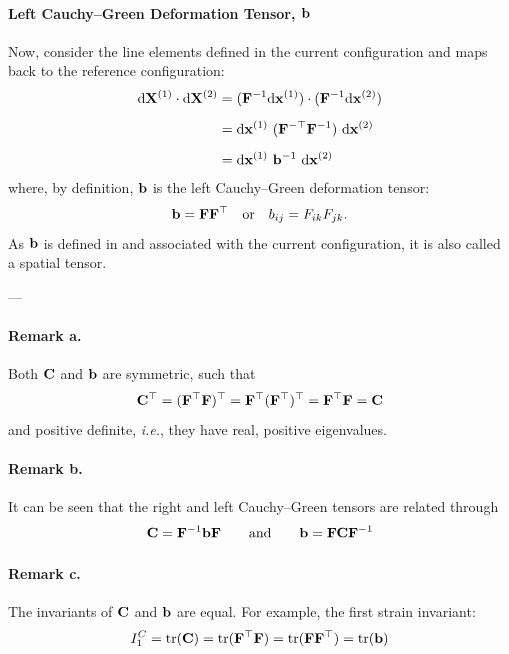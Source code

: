 \documentclass[12pt, a4paper]{article}
\numberwithin{equation}{section}
\begin{document}
\paragraph{Left Cauchy--Green Deformation Tensor, $\bf b$} Now, consider the line elements defined in the current configuration and maps back to the reference configuration:
\begin{align}
    \mathrm{d} {\bf X}^{(1)} \cdot \mathrm{d} {\bf X}^{(2)}
    & = (\bF^{-1} \mathrm{d} {\bf x}^{(1)}) \cdot (\bF^{-1} \mathrm{d} {\bf x}^{(2)}) \nonumber \\[.5em]
    & = \mathrm{d} {\bf x}^{(1)} \ (\bF^{-\top} \bF^{-1}) \ \mathrm{d} {\bf x}^{(2)} \nonumber \\[.5em]
    & = \mathrm{d} {\bf x}^{(1)} \ \bb^{-1} \ \mathrm{d} {\bf x}^{(2)}
\end{align}
where, by definition, $\bf b$ is the left Cauchy--Green deformation tensor:
\begin{equation}
    \mathbf{b} = \mathbf{F}  \mathbf{F}^\top \quad \text{or} \quad
    b_{ij} = F_{ik} F_{jk}.
\end{equation}
As $\bf b$ is defined in and associated with the current configuration, it is also called a spatial tensor.

---

\paragraph{Remark a.} Both $\bf C$ and $\bf b$ are symmetric, such that
\[
    \mathbf{C}^\top 
    = (\mathbf{F}^\top \mathbf{F})^\top 
    = \mathbf{F}^\top (\mathbf{F}^\top)^\top 
    = \mathbf{F}^\top \mathbf{F}  
    = \mathbf{C}
\]
and positive definite, \textit{i.e.}, they have real, positive eigenvalues.

\paragraph{Remark b.} It can be seen that the right and left Cauchy--Green tensors are related through
\[
    \mathbf{C} = \mathbf{F}^{-1} \mathbf{b} \mathbf{F} \quad \quad \text{and} \quad \quad \mathbf{b} = \mathbf{F} \mathbf{C} \mathbf{F}^{-1}
\]

\paragraph{Remark c.} The invariants of $\bf C$ and $\bf b$ are equal. For example, the first strain invariant:
\[
    I_1^C = \mathrm{tr} (\mathbf{C}) = \mathrm{tr} (\mathbf{F}^\top\mathbf{F}) = \mathrm{tr} (\mathbf{F} \mathbf{F}^\top) = \mathrm{tr} (\mathbf{b})
\]

\end{document}
